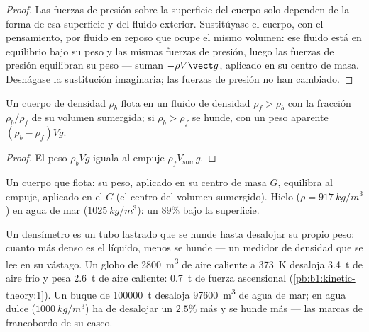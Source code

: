 \begin{proof}
Las fuerzas de presión sobre la superficie del cuerpo solo dependen de la
forma de esa superficie y del fluido exterior. Sustitúyase el cuerpo, con
el pensamiento, por fluido en reposo que ocupe el mismo volumen: ese
fluido está en equilibrio bajo su peso y las mismas fuerzas de presión,
luego las fuerzas de presión equilibran su peso --- suman $-\rho V\vect g$,
aplicado en su centro de masa. Deshágase la sustitución imaginaria; las
fuerzas de presión no han cambiado.
\end{proof}

\begin{corollary}[Flotación]\label{cor:b1:fluid-statics:floating}
Un cuerpo de densidad $\rho_b$ flota en un fluido de densidad $\rho_f > \rho_b$
con la fracción $\rho_b/\rho_f$ de su volumen sumergida; si $\rho_b >
\rho_f$ se hunde, con un peso aparente $(\rho_b - \rho_f)Vg$.
\end{corollary}

\begin{proof}
El peso $\rho_bVg$ iguala al empuje $\rho_fV_{\text{sum}}g$.
\end{proof}

\begin{omfigure}

{\small Un cuerpo que flota: su peso, aplicado en su centro de masa $G$,
equilibra al empuje, aplicado en el  $C$ (el centro del
volumen sumergido). Hielo ($\rho = \qty{917}{kg/m^3}$) en agua de mar
($\qty{1025}{kg/m^3}$): un $89\%$ bajo la superficie.}
\end{omfigure}

\begin{example}\label{ex:b1:fluid-statics:buoy}
Un densímetro es un tubo lastrado que se hunde hasta desalojar su propio
peso: cuanto más denso es el líquido, menos se hunde --- un medidor de
densidad que se lee en su vástago. Un globo de \qty{2800}{m^3} de aire
caliente a \qty{373}{K} desaloja \qty{3.4}{t} de aire frío y pesa
\qty{2.6}{t} de aire caliente: \qty{0.7}{t} de fuerza ascensional
(\cref{pb:b1:kinetic-theory:1}). Un buque de \qty{100000}{t} desaloja
\qty{97600}{m^3} de agua de mar; en agua dulce ($\qty{1000}{kg/m^3}$) ha de
desalojar un $2.5\%$ más y se hunde más --- las marcas de francobordo de su
casco.
\end{example}

